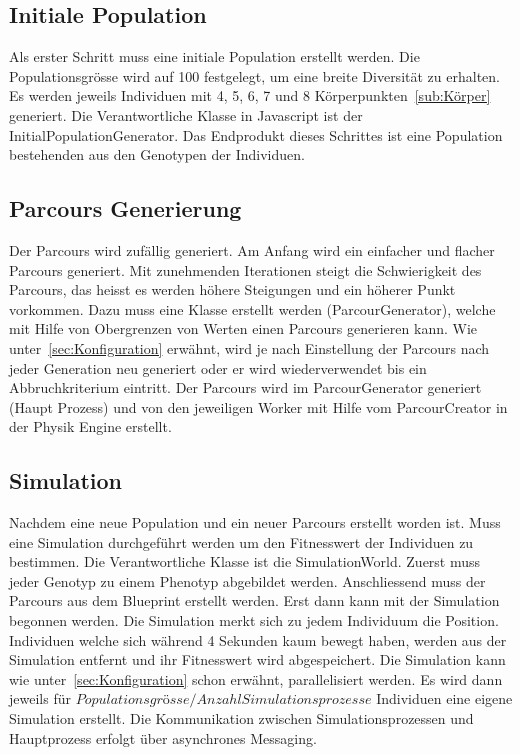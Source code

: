     \subsection{Initiale Population\label{sec:Initiale Polulation}}

      Als erster Schritt muss eine initiale Population erstellt werden. Die Populationsgrösse wird auf 100 festgelegt,
      um eine breite Diversität zu erhalten.
      Es werden jeweils Individuen mit 4, 5, 6, 7 und 8 Körperpunkten~\ref{sub:Körper} generiert.
      Die Verantwortliche Klasse in Javascript ist der InitialPopulationGenerator.
      Das Endprodukt dieses Schrittes ist eine Population bestehenden aus den Genotypen der Individuen.

    \subsection{Parcours Generierung\label{sec:Parcour Generierung}}

      Der Parcours wird zufällig generiert. Am Anfang wird ein einfacher und flacher Parcours generiert.
      Mit zunehmenden Iterationen steigt die Schwierigkeit des Parcours,
      das heisst es werden höhere Steigungen und ein höherer Punkt vorkommen.
      Dazu muss eine Klasse erstellt werden (ParcourGenerator),
      welche mit Hilfe von Obergrenzen von Werten einen Parcours generieren kann.
      Wie unter~\ref{sec:Konfiguration} erwähnt,
      wird je nach Einstellung der Parcours nach jeder Generation neu generiert oder er wird wiederverwendet
      bis ein Abbruchkriterium eintritt.
      Der Parcours wird im ParcourGenerator generiert (Haupt Prozess) und
      von den jeweiligen Worker mit Hilfe vom ParcourCreator in der Physik Engine erstellt.

    \subsection{Simulation}

      Nachdem eine neue Population und ein neuer Parcours erstellt worden ist.
      Muss eine Simulation durchgeführt werden um den Fitnesswert der Individuen zu bestimmen.
      Die Verantwortliche Klasse ist die SimulationWorld.
      Zuerst muss jeder Genotyp zu einem Phenotyp abgebildet werden.
      Anschliessend muss der Parcours aus dem Blueprint erstellt werden.
      Erst dann kann mit der Simulation begonnen werden.
      Die Simulation merkt sich zu jedem Individuum die Position.
      Individuen welche sich während 4 Sekunden kaum bewegt haben,
      werden aus der Simulation entfernt und ihr Fitnesswert wird abgespeichert.
      Die Simulation kann wie unter~\ref{sec:Konfiguration} schon erwähnt, parallelisiert werden.
      Es wird dann jeweils für \( Populationsgrösse / Anzahl Simulationsprozesse \) Individuen eine eigene Simulation erstellt.
      Die Kommunikation zwischen Simulationsprozessen und Hauptprozess erfolgt über asynchrones Messaging.

